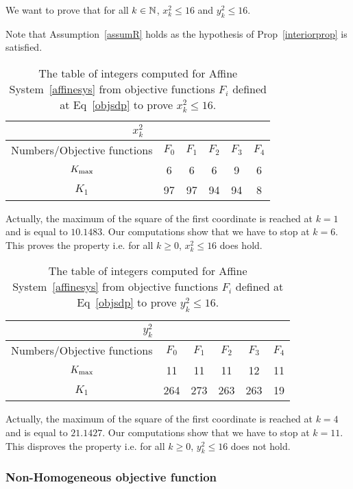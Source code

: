 \documentclass[10pt]{llncs}
\begin{document}
We want to prove that for all $k\in\mathbb{N}$, $x_k^2\leq 16$ and $y_k^2\leq 16$.

Note that Assumption~\ref{assumR} holds as the hypothesis of Prop~\ref{interiorprop} is satisfied.
\begin{table}[h!]
\begin{center}
\begin{tabular}{|c|c|c|c|c|c|}
\hline
\multicolumn{6}{|c|}{$x^2_k$}\\
\hline
Numbers/Objective functions & $F_0$ & $F_{1}$ & $F_{2}$ & $F_3$ & $F_4$ \\
\hline
$K_{\rm max}$ & 6&6 & 6&9&6 \\
\hline
 $K_{1}$ & 97& 97& 94&94 &8 \\
\hline
\end{tabular}
\end{center}
\caption{The table of integers computed for Affine System~\eqref{affinesys} from objective functions $F_i$ defined at Eq~\eqref{objsdp} to prove $x_k^2\leq 16$.}
\end{table}
Actually, the maximum of the square of the first coordinate is reached at $k=1$ and is equal to $10.1483$. Our computations show that we have to stop at $k=6$. This proves the property i.e. for all $k\geq 0$, $x_k^2\leq 16$ does hold. 

\begin{table}[h!]
\begin{center}
\begin{tabular}{|c|c|c|c|c|c|}
\hline
\multicolumn{6}{|c|}{$y_k^2$}\\
\hline
Numbers/Objective functions & $F_0$ & $F_{1}$ & $F_{2}$ & $F_3$ & $F_4$ \\
\hline
$K_{\rm max}$ &11 &11 &11 &12 &11 \\
\hline
 $K_{1}$ &264 & 273&263 & 263&19 \\
\hline
\end{tabular}
\end{center}
\caption{The table of integers computed for Affine System~\eqref{affinesys} from objective functions $F_i$ defined at Eq~\eqref{objsdp} to prove $y_k^2\leq 16$.}
\end{table}

Actually, the maximum of the square of the first coordinate is reached at $k=4$ and is equal to $21.1427$. Our computations show that we have to stop at $k=11$. This disproves the property i.e. for all $k\geq 0$, $y_k^2\leq 16$ does not hold. 


\subsubsection{Non-Homogeneous objective function}
\end{document}
